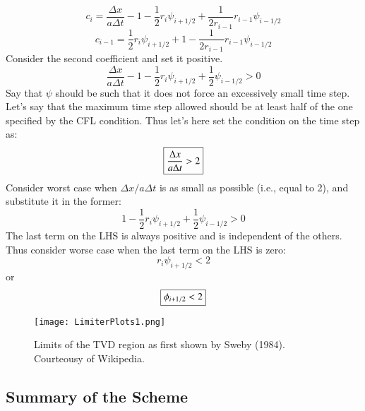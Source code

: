 \documentclass{warpdoc}
\newcommand\frameeqn[1]{\fbox{$\displaystyle #1$}}
\begin{document}
%
%
\begin{equation}
c_i=\frac{\Delta x}{a\Delta t} - 1 - \frac{1}{2} r_i \psi_{i+1/2} + \frac{1}{2 r_{i-1}} r_{i-1} \psi_{i-1/2} 
\end{equation}
%
%
\begin{equation}
c_{i-1}=\frac{1}{2} r_i \psi_{i+1/2} +1 - \frac{1}{2 r_{i-1}} r_{i-1} \psi_{i-1/2} 
\end{equation}
%
Consider the second coefficient and set it positive.
%
\begin{equation}
\frac{\Delta x}{a\Delta t} - 1 - \frac{1}{2} r_i \psi_{i+1/2} + \frac{1}{2 }  \psi_{i-1/2} >0
\end{equation}
%
 Say that $\psi$ should be such that it does not force an excessively small time step. Let's say that the maximum time step allowed should be at least half of the one specified by the CFL condition. Thus let's here set the condition on the time step as:
%
\begin{equation}
\frameeqn{
\frac{\Delta x}{a\Delta t}>2
}
\end{equation}
% 
Consider worst case when $\Delta x/a\Delta t$ is as small as possible (i.e., equal to 2), and substitute it in the former:
%
\begin{equation}
1 - \frac{1}{2} r_i \psi_{i+1/2} + \frac{1}{2 }  \psi_{i-1/2} >0
\end{equation}
%
The last term on the LHS is always positive and is independent of the others. Thus consider worse case when the last term on the LHS is zero:
%
\begin{equation}
   r_i \psi_{i+1/2}  <2
\end{equation}
%
or
%
\begin{equation}
\frameeqn{
   \phi_{i+1/2}  <2
}
\end{equation}
%


%
\begin{figure}[h]
 \begin{center}
   \texttt{[image: LimiterPlots1.png]}
 \end{center}
\caption{Limits of the TVD region as first shown by Sweby (1984). Courteousy of Wikipedia.}
\label{fig:TVD_limiter_region}
\end{figure}
%



\subsection{Summary of the Scheme}
\end{document}
